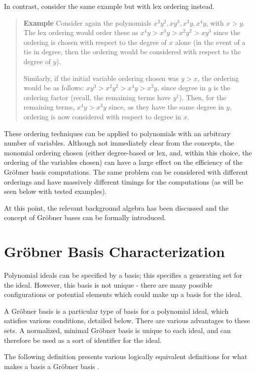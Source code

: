 \documentclass[letterpaper,12pt,titlepage,oneside,final]{book}
\newenvironment{example}{\begin{quote}%
  \textbf{Example }%
  \quad
}{%
\end{quote}%
}
\begin{document}
In contrast, consider the same example but with lex ordering instead.
\begin{example}\label{ex: Multivariate lex ordering}
  Consider again the polynomials ${x^2y^2, xy^3, x^3y, x^4y}$, with ${x > y}$.  The lex ordering would order these as ${x^4y > x^3y > x^2y^2 > xy^3}$ since the ordering is chosen with respect to the degree of ${x}$ alone (in the event of a tie in degree, then the ordering would be considered with respect to the degree of ${y}$).

  Similarly, if the initial variable ordering chosen was ${y > x}$, the ordering would be as follows:
  ${xy^3 > x^2y^2 > x^4y > x^3y}$, since degree in ${y}$ is the ordering factor (recall, the remaining terms have ${y^1}$).  Then, for the remaining terms, ${x^4y > x^3y}$ since, as they have the same degree in ${y}$, ordering is now considered with respect to degree in ${x}$.
\end{example}

These ordering techniques can be applied to polynomials with an arbitrary number of variables.  Although not immediately clear from the concepts, the monomial ordering chosen (either degree-based or lex, and, within this choice, the ordering of the variables chosen) can have a large effect on the efficiency of the Gr\"obner basis computations.  The same problem can be considered with different orderings and have massively different timings for the computations (as will be seen below with tested examples).

At this point, the relevant background algebra has been discussed and the concept of Gr\"obner bases can be formally introduced.


\section{Gr\"obner Basis Characterization}

Polynomial ideals can be specified by a basis; this specifies a generating set for the ideal.  However, this basis is not unique - there are many possible configurations or potential elements which could make up a basis for the ideal.  

A Gr\"obner basis is a particular type of basis for a polynomial ideal, which satisfies various conditions, detailed below.  There are various advantages to these sets.  A normalized, minimal Gr\"obner basis is unique to each ideal, and can therefore be used as a sort of identifier for the ideal. 

The following definition presents various logically equivalent definitions for what makes a basis a Gr\"obner basis \cite{Adams}. 
\end{document}
